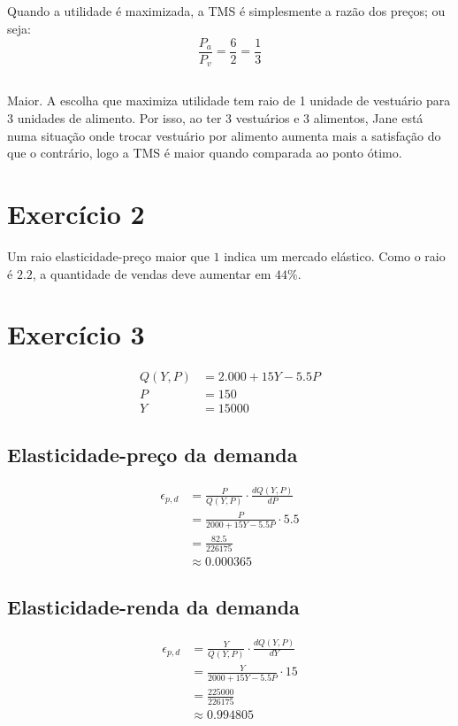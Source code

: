 \documentclass{article}
\begin{document}
\subsection{}

Quando a utilidade é maximizada, a TMS é simplesmente a razão dos preços; ou
seja:
\[
	\frac{P_a}{P_v} = \frac{6}{2} = \frac{1}{3}
\]

\subsection{}

Maior. A escolha que maximiza utilidade tem raio de 1 unidade de vestuário para
3 unidades de alimento. Por isso, ao ter 3 vestuários e 3 alimentos, Jane está
numa situação onde trocar vestuário por alimento aumenta mais a satisfação do
que o contrário, logo a TMS é maior quando comparada ao ponto ótimo.

\section{Exercício 2}
Um raio elasticidade-preço maior que \(1\) indica um mercado elástico. Como o
raio é \(2.2\), a quantidade de vendas deve aumentar em \(44\%\).

\section{Exercício 3}
\[
	\begin{aligned}
		Q(Y, P) & = 2.000 + 15Y - 5.5P \\
		P       & = 150                \\
		Y       & = 15 000
	\end{aligned}
\]
\subsection{Elasticidade-preço da demanda}
\[
	\begin{aligned}
		\epsilon_{p,d} & = \frac{P}{Q(Y, P)} \cdot \frac{dQ(Y, P)}{dP} \\
		               & = \frac{P}{2000 + 15Y - 5.5P} \cdot 5.5       \\
		               & = \frac{82.5}{226175}                         \\
		               & \approx 0.000365
	\end{aligned}
\]
\subsection{Elasticidade-renda da demanda}
\[
	\begin{aligned}
		\epsilon_{p,d} & = \frac{Y}{Q(Y, P)} \cdot \frac{dQ(Y, P)}{dY} \\
		               & = \frac{Y}{2000 + 15Y - 5.5P} \cdot 15        \\
		               & = \frac{225000}{226175}                       \\
		               & \approx 0.994805
	\end{aligned}
\]
\end{document}
